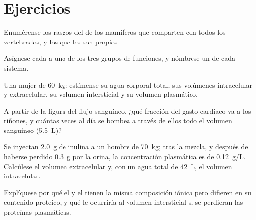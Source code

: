 \section{Ejercicios}

\begin{exercise}[$\star$]\label{exo:b1:mammal-organization:1}
Enumérense los rasgos del  de los mamíferos que
comparten con todos los vertebrados, y los que les son propios.
\end{exercise}

\begin{exercise}[$\star$]\label{exo:b1:mammal-organization:2}
Asígnese cada  a uno de los tres grupos de funciones, y
nómbrese un  de cada sistema.
\end{exercise}

\begin{exercise}[$\star$]\label{exo:b1:mammal-organization:3}
Una mujer de \qty{60}{kg}: estímense su agua corporal total, sus volúmenes
intracelular y extracelular, su volumen intersticial y su volumen
plasmático.
\end{exercise}

\begin{exercise}[$\star$]\label{exo:b1:mammal-organization:4}
A partir de la figura del flujo sanguíneo, ¿qué fracción del gasto cardíaco
va a los riñones, y cuántas veces al día se bombea a través de ellos todo el
volumen sanguíneo (\qty{5.5}{L})?
\end{exercise}

\begin{exercise}[$\star\star$]\label{exo:b1:mammal-organization:5}
Se inyectan \qty{2.0}{g} de inulina a un hombre de \qty{70}{kg}; tras la
mezcla, y después de haberse perdido \qty{0.3}{g} por la orina, la
concentración plasmática es de \qty{0.12}{g/L}. Calcúlese el volumen
extracelular y, con un agua total de \qty{42}{L}, el volumen intracelular.
\end{exercise}

\begin{exercise}[$\star\star$]\label{exo:b1:mammal-organization:6}
Explíquese por qué el  y el  tienen la misma
composición iónica pero difieren en su contenido proteico, y qué le ocurriría
al volumen intersticial si se perdieran las proteínas plasmáticas.
\end{exercise}

